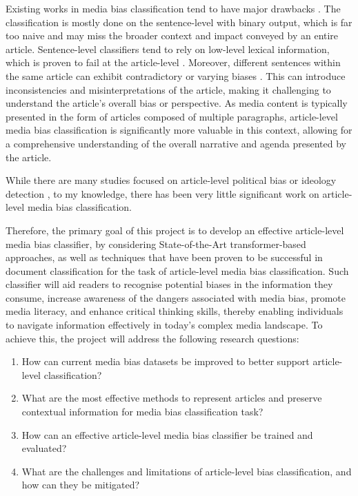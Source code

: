 Existing works in media bias classification tend to have major drawbacks \cite{maab-2023-lexical-bias-detection, maab-2023-target-aware, guo-2022-modeling, van-den-berg-2020-context,lee-2021-unifying,lei-2022-sentence,lei-2024-event-relation}.
The classification is mostly done on the sentence-level with binary output, which is far too naive and may miss the broader context and impact conveyed by an entire article. Sentence-level classifiers tend to rely on low-level lexical information, which is proven to fail at the article-level \cite{chen-2020-detecting-media-bias-gaussian}. Moreover, different sentences within the same article can exhibit contradictory or varying biases \cite{lei-2022-sentence}. This can introduce inconsistencies and misinterpretations of the article, making it challenging to understand the article's overall bias or perspective. As media content is typically presented in the form of articles composed of multiple paragraphs, article-level media bias classification is significantly more valuable in this context, allowing for a comprehensive understanding of the overall narrative and agenda presented by the article. 

While there are many studies focused on article-level political bias or ideology detection \cite{kulkarni-2018-multi-view,baly-2020-we-can-detect-your-bias,baly-2019-mt}, to my knowledge, there has been very little significant work on article-level media bias classification.

Therefore, the primary goal of this project is to develop an effective article-level media bias classifier, by considering State-of-the-Art transformer-based approaches, as well as techniques that have been proven to be successful in document classification \cite{su-2021-classifying,wan-2019-long-length,park-2022-efficient,pappagari-2019-hierarchical} for the task of article-level media bias classification. Such classifier will aid readers to recognise potential biases in the information they consume, increase awareness of the dangers associated with media bias, promote media literacy, and enhance critical thinking skills, thereby enabling individuals to navigate information effectively in today's complex media landscape. To achieve this, the project will address the following research questions:
\begin{enumerate}
    \item How can current media bias datasets be improved to better support article-level classification?
    \item What are the most effective methods to represent articles and preserve contextual information for media bias classification task?
    \item How can an effective article-level media bias classifier be trained and evaluated?
    \item What are the challenges and limitations of article-level bias classification, and how can they be mitigated?
\end{enumerate}

